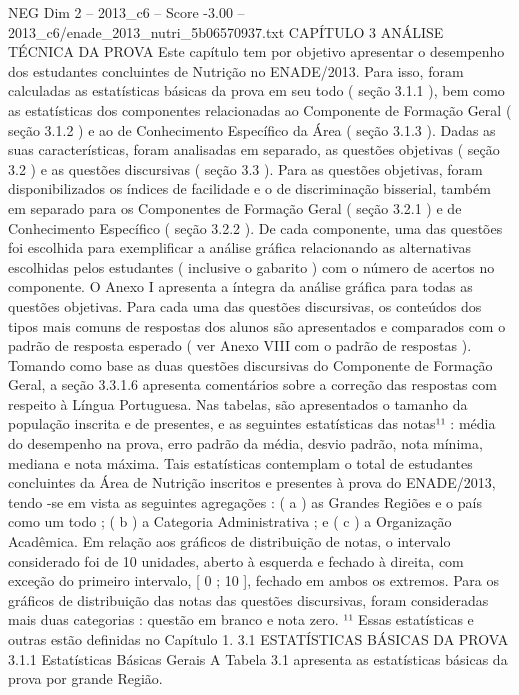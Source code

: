 \begin{textsample}{NEG Dim 2 – 2013\_c6 – Score -3.00 – 2013\_c6/enade\_2013\_nutri\_5b06570937.txt}  \label{ex:f2_neg_054}
CAPÍTULO 3 ANÁLISE TÉCNICA DA PROVA Este capítulo tem por objetivo apresentar o desempenho dos estudantes concluintes de Nutrição no ENADE/2013.
Para isso, foram calculadas as estatísticas básicas da prova em seu todo ( seção 3.1.1 ), bem como as estatísticas dos componentes relacionadas ao Componente de Formação Geral ( seção 3.1.2 ) e ao de Conhecimento Específico da Área ( seção 3.1.3 ).
Dadas as suas características, foram analisadas em separado, as questões objetivas ( seção 3.2 ) e as questões discursivas ( seção 3.3 ).
Para as questões objetivas, foram disponibilizados os índices de facilidade e o de discriminação bisserial, também em separado para os Componentes de Formação Geral ( seção 3.2.1 ) e de Conhecimento Específico ( seção 3.2.2 ).
De cada componente, uma das questões foi escolhida para exemplificar a análise gráfica relacionando as alternativas escolhidas pelos estudantes ( inclusive o gabarito ) com o número de acertos no componente.
O Anexo I apresenta a íntegra da análise gráfica para todas as questões objetivas.
Para cada uma das questões discursivas, os conteúdos dos tipos mais comuns de respostas dos alunos são apresentados e comparados com o padrão de resposta esperado ( ver Anexo VIII com o padrão de respostas ).
Tomando como base as duas questões discursivas do Componente de Formação Geral, a seção 3.3.1.6 apresenta comentários sobre a correção das respostas com respeito à Língua Portuguesa.
Nas tabelas, são apresentados o tamanho da população inscrita e de presentes, e as seguintes estatísticas das notas¹¹ : média do desempenho na prova, erro padrão da média, desvio padrão, nota mínima, mediana e nota máxima.
Tais estatísticas contemplam o total de estudantes concluintes da Área de Nutrição inscritos e presentes à prova do ENADE/2013, tendo -se em vista as seguintes agregações : ( a ) as Grandes Regiões e o país como um todo ; ( b ) a Categoria Administrativa ; e ( c ) a Organização Acadêmica.
Em relação aos gráficos de distribuição de notas, o intervalo considerado foi de 10 unidades, aberto à esquerda e fechado à direita, com exceção do primeiro intervalo, [ 0 ; 10 ], fechado em ambos os extremos.
Para os gráficos de distribuição das notas das questões discursivas, foram consideradas mais duas categorias : questão em branco e nota zero. ¹¹ Essas estatísticas e outras estão definidas no Capítulo 1. 3.1 ESTATÍSTICAS BÁSICAS DA PROVA 3.1.1 Estatísticas Básicas Gerais A Tabela 3.1 apresenta as estatísticas básicas da prova por grande Região.

\end{textsample}
